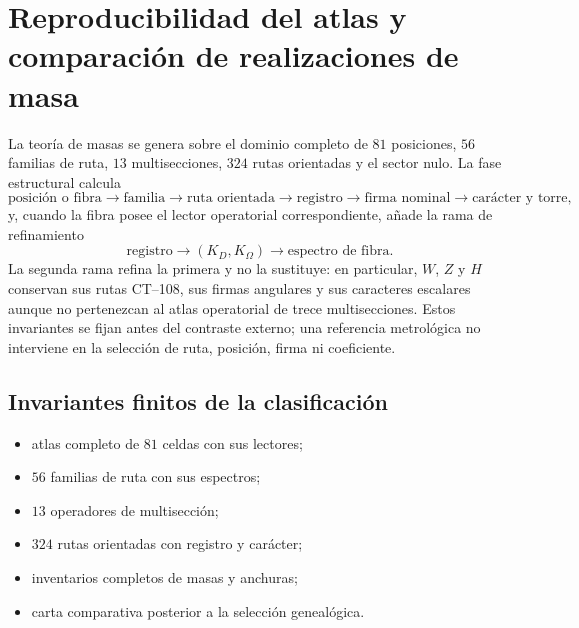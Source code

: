\HMTDemoteHeadings


\HMTRestoreHeadings

\chapter{Reproducibilidad del atlas y comparación de realizaciones de masa}
\label{app:reproducibilidad-masas-acumulativa}
\label{app:suplemento-digital-masas-rev11}

La teoría de masas se genera sobre el dominio completo de
\(81\) posiciones, \(56\) familias de ruta, \(13\) multisecciones,
\(324\) rutas orientadas y el sector nulo. La fase estructural calcula
\[
\text{posición o fibra}\longrightarrow\text{familia}
\longrightarrow\text{ruta orientada}\longrightarrow\text{registro}
\longrightarrow\text{firma nominal}\longrightarrow\text{carácter y torre},
\]
y, cuando la fibra posee el lector operatorial correspondiente, añade la
rama de refinamiento
\[
 \text{registro}\longrightarrow(K_D,K_\Omega)
 \longrightarrow\text{espectro de fibra}.
\]
La segunda rama refina la primera y no la sustituye: en particular,
\(W\), \(Z\) y \(H\) conservan sus rutas CT--108, sus firmas angulares y
sus caracteres escalares aunque no pertenezcan al atlas operatorial de
trece multisecciones. Estos invariantes se fijan antes del contraste externo;
una referencia metrológica no interviene en la selección de ruta, posición,
firma ni coeficiente.

\section{Invariantes finitos de la clasificación}
\label{sec:fuentes-certificado-tabla-masas-acumulativa}

\begin{itemize}
 \item atlas completo de $81$ celdas con sus lectores;
 \item $56$ familias de ruta con sus espectros;
 \item $13$ operadores de multisección;
 \item $324$ rutas orientadas con registro y carácter;
 \item inventarios completos de masas y anchuras;
 \item carta comparativa posterior a la selección genealógica.
\end{itemize}

